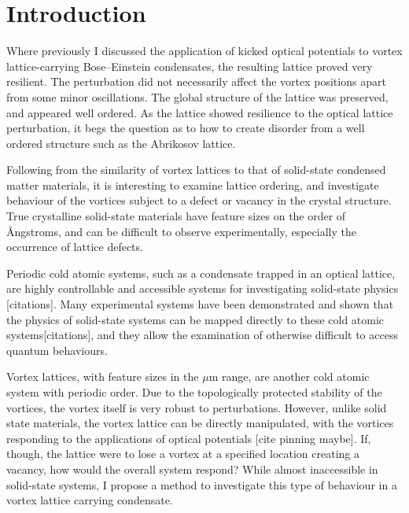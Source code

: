 \section{Introduction}\label{sec:ch6_intro}
Where previously I discussed the application of kicked optical potentials to vortex lattice-carrying Bose--Einstein condensates, the resulting lattice proved very resilient. The perturbation did not necessarily affect the vortex positions apart from some minor oscillations. The global structure of the lattice was preserved, and appeared well ordered. As the lattice showed resilience to the optical lattice perturbation, it begs the question as to how to create disorder from a well ordered structure such as the Abrikosov lattice.

Following from the similarity of vortex lattices to that of solid-state condensed matter materials, it is interesting to examine lattice ordering, and investigate behaviour of the vortices subject to a defect or vacancy in the crystal structure. True crystalline solid-state materials have feature sizes on the order of {\AA}ngstroms, and can be difficult to observe experimentally, especially the occurrence of lattice defects.

Periodic cold atomic systems, such as a condensate trapped in an optical lattice, are highly controllable and accessible systems for investigating solid-state physics [citations]. Many experimental systems have been demonstrated and shown that the physics of solid-state systems can be mapped directly to these cold atomic systems[citations], and they allow the examination of otherwise difficult to access quantum behaviours.

Vortex lattices, with feature sizes in the $\mu$m range, are another cold atomic system with periodic order. Due to the topologically protected stability of the vortices, the vortex itself is very robust to perturbations. However, unlike solid state materials, the vortex lattice can be directly manipulated, with the vortices responding to the applications of optical potentials [cite pinning maybe]. If, though, the lattice were to lose a vortex at a specified location creating a vacancy, how would the overall system respond? While almost inaccessible in solid-state systems, I propose a method to investigate this type of behaviour in a vortex lattice carrying condensate.

